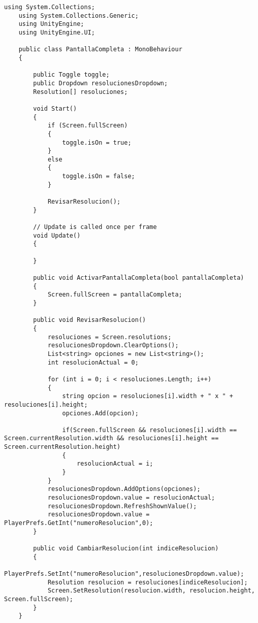 \begin{lstlisting}[frame=single]
    using System.Collections;
    using System.Collections.Generic;
    using UnityEngine;
    using UnityEngine.UI;

    public class PantallaCompleta : MonoBehaviour
    {
        
        public Toggle toggle;
        public Dropdown resolucionesDropdown;
        Resolution[] resoluciones;
        
        void Start()
        {
            if (Screen.fullScreen)
            {
                toggle.isOn = true;
            }
            else
            {
                toggle.isOn = false;
            }

            RevisarResolucion();
        }

        // Update is called once per frame
        void Update()
        {
            
        }
        
        public void ActivarPantallaCompleta(bool pantallaCompleta)
        {
            Screen.fullScreen = pantallaCompleta;
        }

        public void RevisarResolucion()
        {
            resoluciones = Screen.resolutions;
            resolucionesDropdown.ClearOptions();
            List<string> opciones = new List<string>();
            int resolucionActual = 0;
            
            for (int i = 0; i < resoluciones.Length; i++)
            {
                string opcion = resoluciones[i].width + " x " + resoluciones[i].height;
                opciones.Add(opcion);
                
                if(Screen.fullScreen && resoluciones[i].width == Screen.currentResolution.width && resoluciones[i].height == Screen.currentResolution.height)
                {
                    resolucionActual = i;
                }
            }
            resolucionesDropdown.AddOptions(opciones);
            resolucionesDropdown.value = resolucionActual;
            resolucionesDropdown.RefreshShownValue();
            resolucionesDropdown.value = PlayerPrefs.GetInt("numeroResolucion",0);
        }
        
        public void CambiarResolucion(int indiceResolucion)
        {
            PlayerPrefs.SetInt("numeroResolucion",resolucionesDropdown.value);
            Resolution resolucion = resoluciones[indiceResolucion];
            Screen.SetResolution(resolucion.width, resolucion.height, Screen.fullScreen);
        }
    }
\end{lstlisting}
